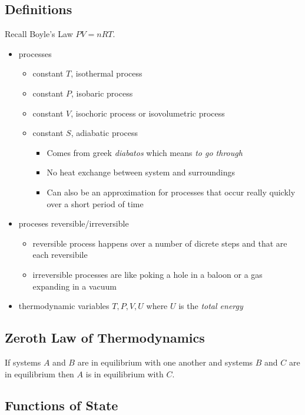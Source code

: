 \documentclass{article}
\begin{document}
\subsection{Definitions}

Recall Boyle's Law $PV = nRT$.

\begin{itemize}
    \item processes
    \begin{itemize}
        \item constant $T$, isothermal process
        \item constant $P$, isobaric process
        \item constant $V$, isochoric process or isovolumetric process
        \item constant $S$, adiabatic process
        \begin{itemize}
            \item Comes from greek \textit{diabatos} which means \textit{to go through}
            \item No heat exchange between system and surroundings
            \item Can also be an approximation for processes that occur really quickly over a short period of time
        \end{itemize}
    \end{itemize}
    \item proceses reversible/irreversible
    \begin{itemize}
        \item reversible process happens over a number of dicrete steps and that are each reversibile
        \item irreversible processes are like poking a hole in a baloon or a gas expanding in a vacuum
    \end{itemize}
    \item thermodynamic variables $T, P, V, U$ where $U$ is the \textit{total energy}
\end{itemize}

\subsection{Zeroth Law of Thermodynamics}

If systems $A$ and $B$ are in equilibrium with one another and systems $B$ and $C$ are in equilibrium then $A$ is in equilibrium with $C$.

\subsection{Functions of State}
\end{document}
